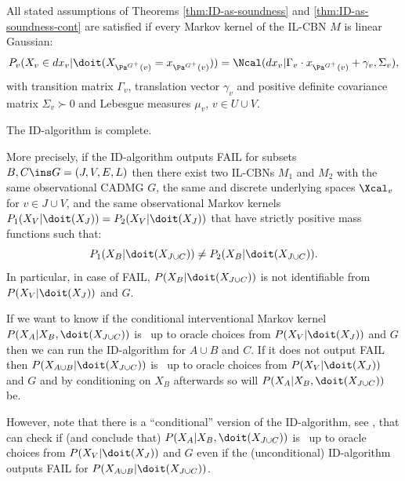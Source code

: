 \begin{Eg}
    All stated assumptions of Theorems \ref{thm:ID-as-soundness} and \ref{thm:ID-as-soundness-cont} 
    are satisfied if every Markov kernel of the IL-CBN $M$ is linear Gaussian: 
    \[P_v(X_v \in dx_v|\doit(X_{\Pa^{G^+}(v)}=x_{\Pa^{G^+}(v)})) = \Ncal(dx_v|\Gamma_v \cdot x_{\Pa^{G^+}(v)} + \gamma_v, \Sigma_v), \] 
    with transition matrix $\Gamma_v$, translation vector $\gamma_v$ and positive definite covariance matrix $\Sigma_v \succ 0$ and Lebesgue measures $\mu_v$, $v \in U \cup V$.
\end{Eg}

\begin{Thm} 
    The ID-algorithm is complete.

    More precisely, if the ID-algorithm outputs FAIL for subsets $B, C \ins G=(J,V,E,L)$ 
    then there exist two IL-CBNs $M_1$ and $M_2$ with the same observational CADMG
    $G$, the same and discrete underlying spaces $\Xcal_v$ for $v \in J \cup V$, and the same 
    observational Markov kernels $P_1(X_V|\doit(X_J)) =P_2(X_V|\doit(X_J))$ that have strictly positive mass functions such that:
    \[ P_1(X_B|\doit(X_{J \cup C})) \neq P_2(X_B|\doit(X_{J \cup C})). \]
    In particular, in case of FAIL, $P(X_B|\doit(X_{J \cup C}))$ is not identifiable from $P(X_V|\doit(X_J))$ and $G$.
\end{Thm}


\begin{Rem} 
    If we want to know if the conditional interventional Markov kernel $P(X_A|X_B,\doit(X_{J \cup C}))$
    is \trackable\ up to oracle choices from $P(X_V|\doit(X_J))$ and $G$ then we can run the ID-algorithm
    for $A \cup B$ and $C$. If it does not output FAIL then $P(X_{A \cup B}|\doit(X_{J \cup C}))$ 
    is \trackable\ up to oracle choices from $P(X_V|\doit(X_J))$ and $G$ and by conditioning on $X_B$ afterwards so will 
    $P(X_A|X_B,\doit(X_{J \cup C}))$ be.

    However, note that there is a ``conditional'' version of the ID-algorithm, see \cite{Tian04s}, 
    that can check if (and conclude that)
    $P(X_A|X_B,\doit(X_{J \cup C}))$ is \trackable\ up to oracle choices from $P(X_V|\doit(X_J))$ and $G$ 
    even if the (unconditional) ID-algorithm outputs FAIL for $P(X_{A \cup B}|\doit(X_{J \cup C}))$.
\end{Rem}

